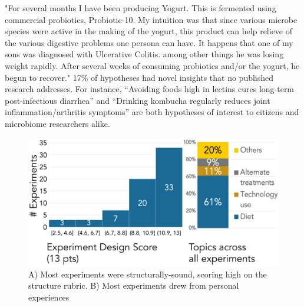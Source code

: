 "For several months I have been producing Yogurt. This is fermented using commercial probiotics, Probiotic-10. My intuition was that since various microbe species were active in the making of the yogurt, this product can help relieve of the various digestive problems one persona can have. It happens that one of my sons was diagnosed with Ulcerative Colitis. among other things he was losing weight rapidly. After several weeks of consuming probiotics and/or the yogurt, he begun to recover."
17\% of hypotheses had novel insights that no published research addresses. For instance, “Avoiding foods high in lectins cures long-term post-infectious diarrhea” and “Drinking kombucha regularly reduces joint inflammation/arthritis symptoms” are both hypotheses of interest to citizens and microbiome researchers alike.

\begin{figure}[h] 
\centering
  \includegraphics[width=1.0\textwidth]{figures/galileo/galileo-study2-1}
  \caption[Results: Most experiments were structurally-sound and drew from personal experiences]
{A) Most experiments were structurally-sound, scoring high on the structure rubric. B) Most experiments drew from personal experiences }
  \label{fig:galileo-result2}
\end{figure}


